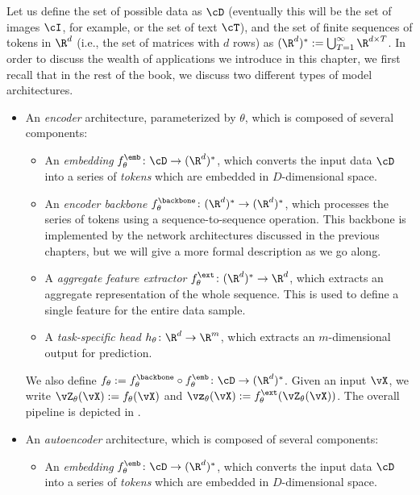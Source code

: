 \documentclass[../../book-main.tex]{subfiles}
\begin{document}
Let us define the set of possible data as \(\cD\) (eventually this will be the set of images \(\cI\), for example, or the set of text \(\cT\)), and the set of finite sequences of tokens in \(\R^{d}\) (i.e., the set of matrices with \(d\) rows) as \((\R^{d})^{*} := \bigcup_{T = 1}^{\infty}\R^{d \times T}\). In order to discuss the wealth of applications we introduce in this chapter, we first recall that in the rest of the book, we discuss two different types of model architectures.
\begin{itemize}
    \item An \textit{encoder} architecture, parameterized by \(\theta\), which is composed of several components:
    \begin{itemize}
        \item An \textit{embedding} \(f_{\theta}^{\emb} \colon \cD \to (\R^{d})^{*}\), which converts the input data \(\cD\) into a series of \textit{tokens} which are embedded in \(D\)-dimensional space.
        \item An \textit{encoder backbone} \(f_{\theta}^{\backbone} \colon (\R^{d})^{*} \to (\R^{d})^{*}\), which processes the series of tokens using a sequence-to-sequence operation. This backbone is implemented by the network architectures discussed in the previous chapters, but we will give a more formal description as we go along.
        \item A \textit{aggregate feature extractor} \(f_{\theta}^{\ext} \colon (\R^{d})^{*} \to \R^{d}\), which extracts an aggregate representation of the whole sequence. This is used to define a single feature for the entire data sample.
        \item A \textit{task-specific head} \(h_{\theta} \colon \R^{d} \to \R^{m}\), which extracts an \(m\)-dimensional output for prediction.
    \end{itemize}
    We also define \(f_{\theta} := f_{\theta}^{\backbone} \circ f_{\theta}^{\emb} \colon \cD \to (\R^{d})^{*}\). Given an input \(\vX\), we write \(\vZ_{\theta}(\vX) := f_{\theta}(\vX)\) and \(\vz_{\theta}(\vX) := f_{\theta}^{\ext}(\vZ_{\theta}(\vX))\). The overall pipeline is depicted in .
    \item An \textit{autoencoder} architecture, which is composed of several components:
    \begin{itemize}
        \item An \textit{embedding} \(f_{\theta}^{\emb} \colon \cD \to (\R^{d})^{*}\), which converts the input data \(\cD\) into a series of \textit{tokens} which are embedded in \(D\)-dimensional space.

\end{itemize}
\end{itemize}
\end{document}
